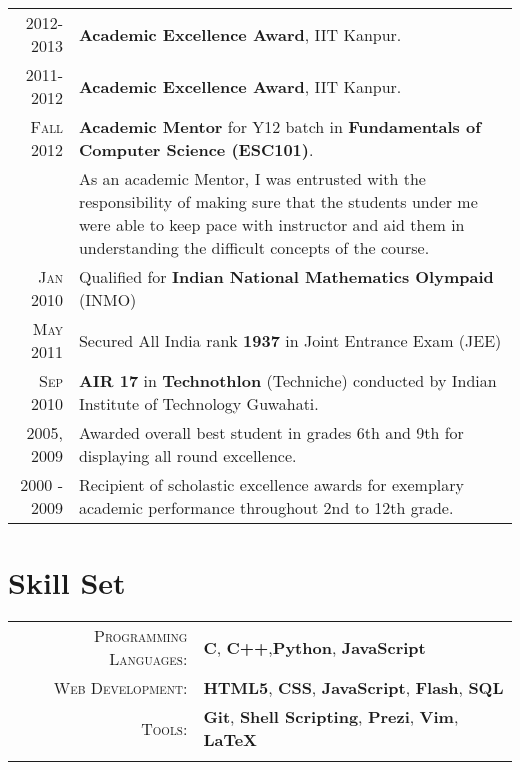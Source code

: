 \documentclass[a4paper,10pt]{article} %
\begin{document}
\begin{tabular}{rp{12cm}}

    \textsc{2012-2013}   & \textbf{Academic Excellence Award}, IIT Kanpur. \\
    \textsc{2011-2012}   & \textbf{Academic Excellence Award}, IIT Kanpur. \\
    \textsc{Fall 2012}   & \textbf{Academic Mentor} for Y12 batch in \textbf{Fundamentals of Computer Science (ESC101)}. \\
                         & \footnotesize{As an academic Mentor, I was entrusted with the responsibility of making sure
                            that the students under me were able to keep pace with instructor and aid them in understanding
                            the difficult concepts of the course. }\\
    \textsc{Jan 2010}    & Qualified for \textbf{Indian National Mathematics Olympaid} (INMO) \\
    \textsc{May 2011}    & Secured All India rank \textbf{1937} in Joint Entrance Exam (JEE) \\
    \textsc{Sep 2010}    & \textbf{AIR 17} in \textbf{Technothlon} (Techniche) conducted by Indian Institute of Technology Guwahati. \\
    \textsc{2005, 2009}  & Awarded overall best student in grades 6th and 9th for displaying all round excellence. \\
    \textsc{2000 - 2009} & Recipient of scholastic excellence awards for exemplary academic performance throughout 2nd to 12th grade. \\

\end{tabular}

\section{Skill Set}

\begin{tabular}{rl}

\textsc{Programming Languages}: %
    & \textbf{C}, \textbf{C++},\textbf{Python}, \textbf{JavaScript} \\
    \textsc{Web Development}: %
    & \textbf{HTML5}, \textbf{CSS}, \textbf{JavaScript}, \textbf{Flash}, \textbf{SQL}\\
    \textsc{Tools}: %
    & \textbf{Git}, \textbf{Shell Scripting}, \textbf{Prezi}, \textbf{Vim}, \textbf{LaTeX}\\
\\

\end{tabular}
\end{document}
